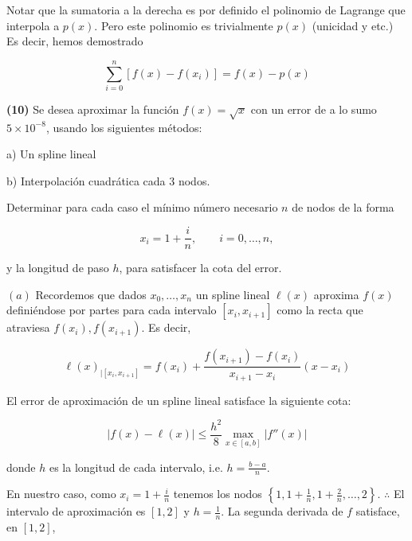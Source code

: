 \documentclass[12pt]{article}
\begin{document}
Notar que la sumatoria a la derecha es por definido el polinomio de Lagrange que
interpola a $p(x)$. Pero este polinomio es trivialmente $p(x)$ (unicidad y etc.)
Es decir, hemos demostrado 

\begin{equation*}
    \sum_{i=0}^n \left[ f(x) - f(x_i) \right] = f(x) - p(x)
\end{equation*}


\pagebreak 


\begin{myframe}
    \textbf{(10)} Se desea aproximar la función $f(x)=\sqrt{x}$ con un error de
    a lo sumo $5\times10^{-8}$, usando los siguientes métodos:

\medskip

a) Un spline lineal

b) Interpolación cuadrática cada 3 nodos.

\medskip

Determinar para cada caso el mínimo número necesario $n$ de nodos de la forma

\[
x_i = 1 + \frac{i}{n}, \qquad i=0,\ldots,n,
\]

y la longitud de paso $h$, para satisfacer la cota del error.
\end{myframe}

$(a)$ Recordemos que dados $x_0, \ldots, x_n$ un spline lineal $\ell(x)$
aproxima $f(x)$ definiéndose por partes para cada intervalo $[x_i, x_{i+1}]$
como la recta que atraviesa $f(x_i), f(x_{i+1})$. Es decir, 

\begin{equation*}
    \ell(x)_{\mid [x_i, x_{i+1}]} = f(x_i) + \frac{f(x_{i+1}) - f(x_i)}{x_{i+1}
    - x_i}(x - x_i)
\end{equation*}

El error de aproximación de un spline lineal satisface la siguiente cota: 

\begin{equation*}
    \left| f(x) - \ell(x) \right| \leq \frac{h^2}{8} \max_{x \in [a, b]} |f''(x)|
\end{equation*}

donde $h$ es la longitud de cada intervalo, i.e. $h = \frac{b-a}{n}$.

En nuestro caso, como $x_i = 1 + \frac{i}{n}$ tenemos los nodos $\left\{ 1, 1 +
\frac{1}{n}, 1 + \frac{2}{n}, \ldots, 2\right\} $. $\therefore $ El intervalo de
aproximación es $[1, 2]$ y $h = \frac{1}{n}$. La segunda derivada de $f$
satisface, en $[1, 2]$,
\end{document}
